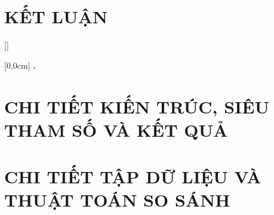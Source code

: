 \documentclass[a4paper,13pt,3p,twoside]{report}
\theoremstyle{definition}
\begin{document}
\newpage
\chapter*{KẾT LUẬN}


\newpage
% 

\newpage
\renewcommand\bibname{TÀI LIỆU THAM KHẢO}
\printbibliography
{}

\appendixpage
\appendix
\addappheadtotoc

[]
\titlespacing*{\chapter}{0pt}{-20pt}{20pt}

    [0.0cm]             %
    {\bfseries\vspace{0.3cm}}                  %
    {{\bfseries{\scshape} \thecontentslabel.\ }} %
    {}         %
    {\contentspage} 
    
\chapter{CHI TIẾT KIẾN TRÚC, SIÊU THAM SỐ VÀ KẾT QUẢ}


\newpage
\chapter{CHI TIẾT TẬP DỮ LIỆU VÀ THUẬT TOÁN SO SÁNH}

\end{document}
